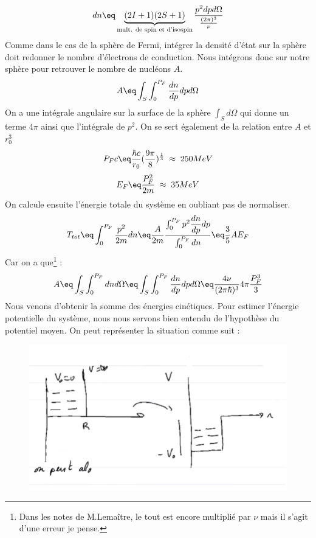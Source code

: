 \begin{equation*}
    dn \eq \underbrace{(2I+1)(2S+1)}_{\text{mult. de spin et d'isospin}}\frac{p^2dpd\Omega}{\frac{(2\pi)^3}{\nu}}
\end{equation*}
Comme dans le cas de la sphère de Fermi, intégrer la densité d'état sur la sphère doit redonner le nombre d'électrons de conduction. Nous intégrons donc sur notre sphère pour retrouver le nombre de nucléons $A$.
\begin{equation*}
    A\eq \int_S\int_0^{P_F} \dfrac{dn}{dp}dpd\Omega
\end{equation*}
On a une intégrale angulaire sur la surface de la sphère $\int_S d\Omega$ qui donne un terme $4\pi$ ainsi que l'intégrale de $p^2$. On se sert également de la relation entre $A$ et $r_0^3$
\begin{equation*}
    P_F c \eq \frac{\hbar c}{r_0}(\frac{9\pi}{8})^\frac{1}{3}\; \approx \; 250MeV
\end{equation*}
\begin{equation*}
    E_F\eq \frac{P_F^2}{2m}  \; \approx \; 35MeV
\end{equation*}
On calcule ensuite l'énergie totale du système en oubliant pas de normaliser.
\begin{equation*}
    T_{tot}\eq \int_0^{P_F} \frac{p^2}{2m}dn 
    \eq \frac{A}{2m} \frac{\int_0^{P_F} p^2 \dfrac{dn}{dp}dp}{\int_0^{P_F}dn}
    \eq \frac{3}{5} A E_F
\end{equation*}
Car on a que\footnote{Dans les notes de M.Lemaître, le tout est encore multiplié par $\nu$ mais il s'agit d'une erreur je pense.} :
\begin{equation*}
    A \eq \int_S\int_0^{P_F}dn d\Omega \eq \int_S\int_0^{P_F}\dfrac{dn}{dp} dpd\Omega \eq \frac{4\nu}{(2\pi\hbar)^3} 4\pi \frac{P_F^3}{3}
\end{equation*}
Nous venons d'obtenir la somme des énergies cinétiques. Pour estimer l'énergie potentielle du système, nous nous servons bien entendu de l'hypothèse du potentiel moyen. On peut représenter la situation comme suit :
\begin{figure}
    \centering
    \includegraphics{Images4/puits2.PNG}
\end{figure}
